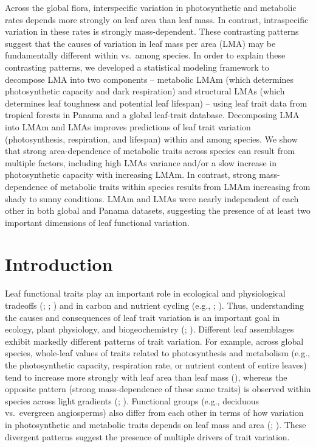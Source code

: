 \documentclass[
  12pt,
  letterpaper,
  DIV=11,
  numbers=noendperiod]{scrartcl}
\begin{document}
Across the global flora, interspecific variation in photosynthetic and
metabolic rates depends more strongly on leaf area than leaf mass. In
contrast, intraspecific variation in these rates is strongly
mass-dependent. These contrasting patterns suggest that the causes of
variation in leaf mass per area (LMA) may be fundamentally different
within vs.~among species. In order to explain these contrasting
patterns, we developed a statistical modeling framework to decompose LMA
into two components -- metabolic LMAm (which determines photosynthetic
capacity and dark respiration) and structural LMAs (which determines
leaf toughness and potential leaf lifespan) -- using leaf trait data
from tropical forests in Panama and a global leaf-trait database.
Decomposing LMA into LMAm and LMAs improves predictions of leaf trait
variation (photosynthesis, respiration, and lifespan) within and among
species. We show that strong area-dependence of metabolic traits across
species can result from multiple factors, including high LMAs variance
and/or a slow increase in photosynthetic capacity with increasing LMAm.
In contrast, strong mass-dependence of metabolic traits within species
results from LMAm increasing from shady to sunny conditions. LMAm and
LMAs were nearly independent of each other in both global and Panama
datasets, suggesting the presence of at least two important dimensions
of leaf functional variation.

\section{Introduction}\label{introduction}

Leaf functional traits play an important role in ecological and
physiological tradeoffs (;
; ) and in carbon and nutrient cycling (e.g.,
;
). Thus, understanding
the causes and consequences of leaf trait variation is an important goal
in ecology, plant physiology, and biogeochemistry
(;
). Different leaf
assemblages exhibit markedly different patterns of trait variation. For
example, across global species, whole-leaf values of traits related to
photosynthesis and metabolism (e.g., the photosynthetic capacity,
respiration rate, or nutrient content of entire leaves) tend to increase
more strongly with leaf area than leaf mass
(), whereas the opposite
pattern (strong mass-dependence of these same traits) is observed within
species across light gradients (; ). Functional groups
(e.g., deciduous vs.~evergreen angiosperms) also differ from each other
in terms of how variation in photosynthetic and metabolic traits depends
on leaf mass and area (;
). These divergent patterns
suggest the presence of multiple drivers of trait variation.
\end{document}
